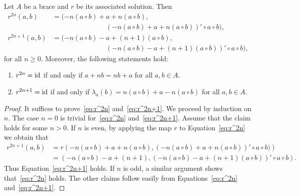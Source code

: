 \begin{lemma}
\label{lem:|r|}
Let $A$ be a brace and $r$ be its associated solution.  Then
  \begin{align} 
  \nonumber
  r^{2n}(a,b)&=(-n(a\circ b)+a+n(a\circ
    b),\\
    \label{eq:r^2n}
    &\phantom{=(-n(a\circ b)+}(-n(a\circ b)+a+n(a\circ b))'\circ a\circ b),\\
  \nonumber
  r^{2n+1}(a,b)&=(-n(a\circ b)-a+(n+1)(a\circ
    b),\\
    \label{eq:r^2n+1}
    &\phantom{=(-n(a\circ b)+}(-n(a\circ b)-a+(n+1)(a\circ b))'\circ a\circ b),
    \end{align} 
    for all $n\geq0$.  Moreover, the following statements hold:
  \begin{enumerate} 
  \item $r^{2n}=\operatorname{id}$ if and only if $a+nb=nb+a$ for all $a,b\in A$.  
      \item $r^{2n+1}=\operatorname{id}$ if and only if $\lambda_a(b)=n(a\circ
	b)+a-n(a\circ b)$ for all $a,b\in A$.  
	\end{enumerate} 
\end{lemma}

\begin{proof} 
It suffices to prove~\eqref{eq:r^2n} and~\eqref{eq:r^2n+1}.  We
  proceed by induction on $n$. The case $n=0$ is trivial for~\eqref{eq:r^2n}
  and~\eqref{eq:r^2n+1}. Assume that the claim holds for some $n>0$. If $n$ is
  even, by applying the map $r$ to Equation~\eqref{eq:r^2n} 
  we obtain that 
  \begin{align*} 
  r^{2n+1}(a,b) &= r\left(
    -n(a\circ b)+a+n(a\circ b),(-n(a\circ b)+a+n(a\circ b))'\circ a\circ b)\right)\\
    &=\left( -n(a\circ b)-a+(n+1),(-n(a\circ b)-a+(n+1)(a\circ b))'\circ a\circ b\right).
    \end{align*} 
    Thus Equation~\eqref{eq:r^2n+1} holds. If $n$ is odd, a similar argument shows
    that~\eqref{eq:r^2n} holds. The other claims follow easily from
    Equations~\eqref{eq:r^2n} and~\eqref{eq:r^2n+1}.
\end{proof}

%


